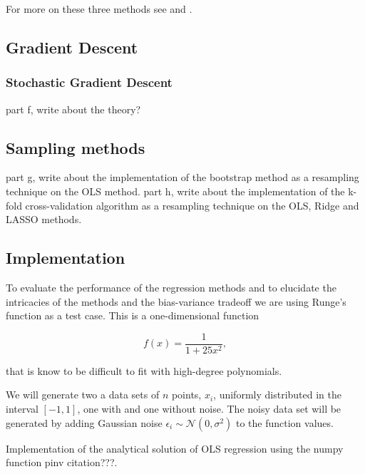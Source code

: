 \documentclass[amssymb,twocolumn,aps]{revtex4}
\begin{document}
For more on these three methods see \cite{compfys} and \cite{hastie}.
\subsection{Gradient Descent}

\subsubsection{Stochastic Gradient Descent}
part f, write about the theory?


\subsection{Sampling methods}
part g, write about the implementation of the bootstrap method as a resampling technique on the OLS method.
part h, write about the implementation of the k-fold cross-validation algorithm as a resampling technique on the OLS, Ridge and LASSO methods.

\subsection{Implementation}
To evaluate the performance of the regression methods and to elucidate the intricacies of the methods and the bias-variance tradeoff we are using Runge's function as a test case.
This is a one-dimensional function

$$
f(x) = \frac{1}{1 + 25x^2},
$$

that is know to be difficult to fit with high-degree polynomials.

We will generate two a data sets of $n$ points, $x_i$, uniformly distributed in the interval $[-1, 1]$, one with and one without noise.
The noisy data set will be generated by adding Gaussian noise $\epsilon_i \sim \mathcal{N}(0, \sigma^2)$ to the function values.



Implementation of the analytical solution of OLS regression using the numpy function pinv {citation???}.
\end{document}

